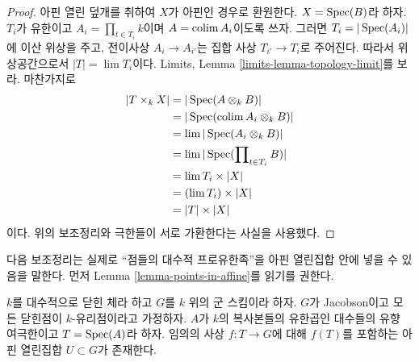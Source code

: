 \begin{proof}
아핀 열린 덮개를 취하여 $X$가 아핀인 경우로 환원한다. $X = \mathop{\mathrm{Spec}}(B)$라 하자.
$T_i$가 유한이고 $A_i = \prod_{t \in T_i} k$이며 $A = \mathop{\mathrm{colim}}\nolimits A_i$이도록 쓰자.
그러면 $T_i = |\mathop{\mathrm{Spec}}(A_i)|$에 이산 위상을 주고, 전이사상 $A_i \to A_{i'}$는 집합 사상
$T_{i'} \to T_i$로 주어진다. 따라서 위상공간으로서 $|T| = \lim T_i$이다. Limits, Lemma
\ref{limits-lemma-topology-limit}를 보라. 마찬가지로
\begin{align*}
|T \times_k X| & =
|\mathop{\mathrm{Spec}}(A \otimes_k B)| \\
& =
|\mathop{\mathrm{Spec}}(\mathop{\mathrm{colim}}\nolimits A_i \otimes_k B)| \\
& =
\mathop{\mathrm{lim}}\nolimits |\mathop{\mathrm{Spec}}(A_i \otimes_k B)| \\
& =
\mathop{\mathrm{lim}}\nolimits |\mathop{\mathrm{Spec}}(\prod\nolimits_{t \in T_i} B)| \\
& =
\mathop{\mathrm{lim}}\nolimits T_i \times |X| \\
& =
(\mathop{\mathrm{lim}}\nolimits T_i) \times |X| \\
& =
|T| \times |X|
\end{align*}
이다. 위의 보조정리와 극한들이 서로 가환한다는 사실을 사용했다.
\end{proof}

\noindent
다음 보조정리는 실제로 ``점들의 대수적 프로유한족''을 아핀 열린집합 안에 넣을 수 있음을 말한다.
먼저 Lemma \ref{lemma-points-in-affine}를 읽기를 권한다.

\begin{lemma}
\label{lemma-compact-set-in-affine}
$k$를 대수적으로 닫힌 체라 하고 $G$를 $k$ 위의 군 스킴이라 하자.
$G$가 Jacobson이고 모든 닫힌점이 $k$-유리점이라고 가정하자. $A$가 $k$의 복사본들의
유한곱인 대수들의 유향 여극한이고 $T = \mathop{\mathrm{Spec}}(A)$라 하자. 임의의 사상 $f : T \to G$에 대해
$f(T)$를 포함하는 아핀 열린집합 $U \subset G$가 존재한다.
\end{lemma}

